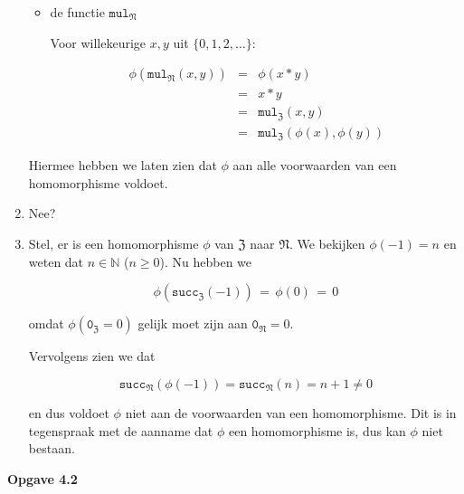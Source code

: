 \documentclass[a4paper,11pt]{article}
\begin{document}
\begin{enumerate}
\begin{itemize}
\item{de functie $\texttt{mul}_{\mathfrak{N}}$}

  Voor willekeurige $x,y$ uit $\{0,1,2,\ldots\}$:

  \begin{eqnarray*}
    \phi(\texttt{mul}_{\mathfrak{N}}(x,y)) & = & \phi(x*y) \\
                                         & = & x*y \\
                                         & = & \texttt{mul}_{\mathfrak{Z}}(x,y) \\
                                         & = & \texttt{mul}_{\mathfrak{Z}}(\phi(x),\phi(y))
  \end{eqnarray*}

\end{itemize}

Hiermee hebben we laten zien dat $\phi$ aan alle voorwaarden van een
homomorphisme voldoet.

\item %

Nee?

\item %

Stel, er is een homomorphisme $\phi$ van $\mathfrak{Z}$ naar
$\mathfrak{N}$. We bekijken $\phi(-1)=n$ en weten dat $n \in \mathbb{N}$ ($n
\ge 0$). Nu hebben we

\begin{displaymath}
\phi(\texttt{succ}_{\mathfrak{Z}}(-1)) \, = \, \phi(0) \, = \, 0
\end{displaymath}

omdat $\phi(\texttt{0}_{\mathfrak{Z}}=0)$ gelijk moet zijn aan
$\texttt{0}_{\mathfrak{N}} = 0$.

Vervolgens zien we dat

\begin{displaymath}
\texttt{succ}_{\mathfrak{N}}(\phi(-1)) = \texttt{succ}_{\mathfrak{N}}(n) = n+1 \ne 0
\end{displaymath}

en dus voldoet $\phi$ niet aan de voorwaarden van een homomorphisme. Dit is in
tegenspraak met de aanname dat $\phi$ een homomorphisme is, dus kan $\phi$ niet
bestaan.\\[2em]

\end{enumerate}


{\bf Opgave 4.2}
\end{document}
